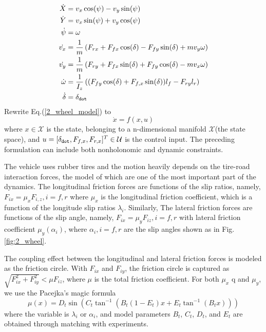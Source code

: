 \documentclass[conference, onecolumn]{IEEEtran}
\begin{document}
\begin{subequations}\label{2_wheel_model}
	\begin{align}
	\dot{X}  & = v_x \cos(\psi)-v_y \sin(\psi)\\
	\dot{Y} & = v_x \sin(\psi)+v_y \cos(\psi) \\
	\dot{\psi} & = \omega \\
	\dot{v_x} & = \frac{1}{m}\left(F_{rx}+F_{fx}\cos(\delta)-F_{fy}\sin(\delta)+mv_y\omega\right)\\
	\dot{v_y} & = \frac{1}{m}\left(F_{ry}+F_{fx}\sin(\delta)+F_{fy}\cos(\delta)-mv_x\omega\right)\\
	\dot{\omega} & = \frac{1}{I_z}\left((F_{fy}\cos(\delta)+F_{f,x}\sin(\delta))l_f-F_{ry}l_r\right) \\
	\dot{\delta} & = \delta_{\tt dot}
	\end{align}
\end{subequations}
Rewrite Eq.(\ref{2_wheel_model}) to
\begin{equation}
	\dot{x} = f(x,u)
\end{equation}
where $x \in \mathcal{X}$ is the state, belonging to a n-dimensional manifold $\mathcal{X}$(the state space), and $u=[\delta_{\tt dot},F_{f,x},F_{r,x}]^T \in \mathcal{U}$ is the control input. The preceding formulation can include both nonholonomic and dynamic constraints. 

The vehicle uses rubber tires and the motion heavily depends on the tire-road interaction forces, the model of which are one of the most important part of the dynamics. The longitudinal friction forces are functions of the slip ratios, namely, $F_{ix} = \mu_x F_{i,z},i=f,r$ where $\mu_x$ is the longitudinal friction coefficient, which is a function of the longitude slip ratios $\lambda_i$. Similarly, The lateral friction forces are functions of the slip angle, namely, $F_{ix} = \mu_y F_{iz},i=f,r$ with lateral friction coefficient $\mu_y(\alpha_i)$, where $\alpha_i,i=f,r$ are the slip angles shown as in Fig.\ref{fig:2_wheel}.

The coupling effect between the longitudinal and lateral
friction forces is modeled as the friction circle. With $F_{ix}$ and $F_{iy}$, the friction circle is captured as $\sqrt{F_{ix}^2+F_{iy}^2}  < \mu F_{iz}$, where $\mu$ is the total friction coefficient. For both $\mu_x$ q and $\mu_y$, we use the Pacejka’s magic formula\cite{pacejka2012tire}
\begin{equation}\label{magicformula}	
	\mu(x)=D_t\sin\left(C_t\tan^{-1}\left(B_t(1-E_t)x+E_t\tan^{-1}(B_tx)\right)\right)
\end{equation}
where the variable is $\lambda_i$ or $\alpha_i$, and model parameters $B_t$, $C_t$, $D_t$, and $E_t$ are obtained through matching with experiments.
\end{document}
